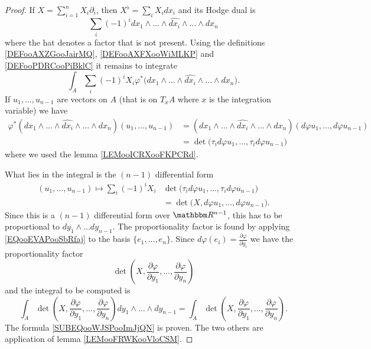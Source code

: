\begin{proof}
    If \( X=\sum_{i=1}^nX_i\partial_i\), then \( X^{\flat}=\sum_{i}X_idx_i\) and its Hodge dual is
    \begin{equation}
        \sum_{i}(-1)^i dx_1\wedge\ldots\wedge\widehat{dx_i}\wedge\ldots\wedge dx_n
    \end{equation}
    where the hat denotes a factor that is not present. Using the definitions \ref{DEFooAXZGooJairMQ}, \ref{DEFooAXFXooWiMLKP} and \ref{DEFooPDRCooPiBklC} it remains to integrate
    \begin{equation}
        \int_A\sum_i(-1)^iX_i\varphi^*\big( dx_1\wedge\ldots\wedge\widehat{dx_i}\wedge\ldots\wedge dx_n \big).
    \end{equation}
    If \( u_1,\ldots, u_{n-1}\) are vectors on \( A\) (that is on \( T_xA\) where \( x\) is the integration variable) we have
    \begin{subequations}
        \begin{align}
            \varphi^*(dx_1\wedge\ldots\wedge \widehat{dx_i}\wedge\ldots\wedge dx_n)(u_1,\ldots, u_{n-1})&= (dx_1\wedge\ldots\wedge \widehat{dx_i}\wedge\ldots\wedge dx_n)(d\varphi u_1,\ldots, d\varphi u_{n-1})\\
            &=\det\big( \tau_id\varphi u_1,\ldots, \tau_id\varphi u_{n-1} \big)
        \end{align}
    \end{subequations}
    where we used the lemma \ref{LEMooICRXooFKPCRd}. 

    What lies in the integral is the \( (n-1)\) differential form 
    \begin{subequations}        \label{EQooEVAPooSbRfaj}
        \begin{align}
           (u_1,\ldots, u_{n-1})\mapsto \sum_{i}(-1)^iX_i&\det\big(    \tau_id\varphi u_1,\ldots, \tau_id\varphi u_{n-1}  \big)\\
            &=\det\big( X,d\varphi u_1,\ldots, d\varphi u_{n-1} \big).
        \end{align}
    \end{subequations}
    Since this is a \( (n-1)\) differential form over \( \eR^{n-1}\), this has to be proportional to \( dy_1\wedge\ldots dy_{n-1}\). The proportionality factor is found by applying \eqref{EQooEVAPooSbRfaj} to the basis \( \{ e_1,\ldots, e_n \}\). Since \( d\varphi(e_i)=\frac{ \partial \varphi }{ \partial y_i }\) we have the proportionality factor
    \begin{equation}
        \det\left( X,\frac{ \partial \varphi }{ \partial y_1 },\ldots, \frac{ \partial \varphi }{ \partial y_n } \right)
    \end{equation}
    and the integral to be computed is
    \begin{equation}
        \int_A\det\left( X,\frac{ \partial \varphi }{ \partial y_1 },\ldots, \frac{ \partial \varphi }{ \partial y_n } \right)dy_1\wedge\ldots\wedge dy_{n-1}=\int_A\det\left( X,\frac{ \partial \varphi }{ \partial y_1 },\ldots, \frac{ \partial \varphi }{ \partial y_n } \right).
    \end{equation}
    The formula \eqref{SUBEQooWJSPooImJjQN} is proven. The two others are application of lemma \ref{LEMooFRWKooVloCSM}.
\end{proof}

